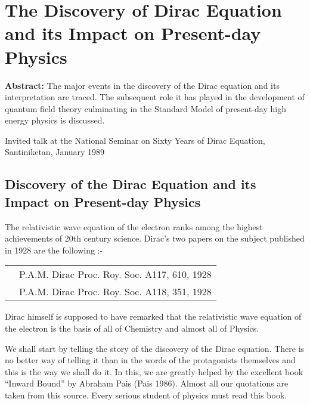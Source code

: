 \chapter{The Discovery of Dirac Equation and its Impact on Present-day Physics}\label{chap7}



\textbf{Abstract:}	The major events in the discovery of the Dirac equation and its interpretation are traced. The subsequent role it has played in the development of quantum field theory culminating in the Standard Model of present-day high energy physics is discussed.

Invited talk at the National Seminar on
Sixty Years of Dirac Equation, Santiniketan, January 1989


\section{Discovery of the Dirac Equation and its Impact on Present-day Physics}

The relativistic wave equation of the electron ranks among the highest achievements of 20th century science. Dirac’s two papers on the subject published in 1928 are the following :-

\begin{center}
\begin{tabular}{|ll|}
\hline
&P.A.M. Dirac Proc. Roy. Soc. A117, 610, 1928\\
&P.A.M. Dirac Proc. Roy. Soc. A118, 351, 1928\\
\hline
\end{tabular}
\end{center}

Dirac himself is supposed to have remarked that the relativistic wave equation of the electron is the basis of all of Chemistry and almost all of Physics.

We shall start by telling the story of the discovery of the Dirac equation. There is no better way of telling it than in the words of the protagonists themselves and this is the way we shall do it. In this, we are greatly helped by the excellent book “Inward Bound” by Abraham Pais (Pais 1986). Almost all our quotations are taken from this source. Every serious student of physics must read this book.

